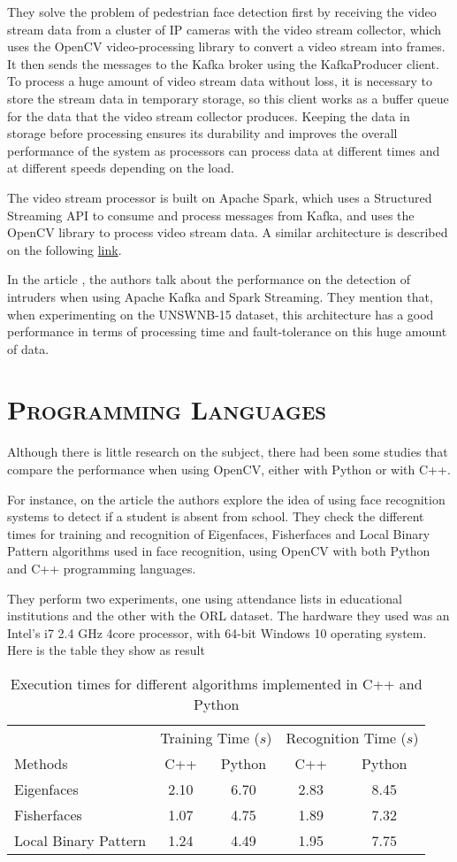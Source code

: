 \documentclass[10pt,letterpaper]{article}
\newcommand{\ssection}[1]{%
  \section*{\normalfont\scshape #1}}
\begin{document}
They solve the problem of pedestrian face detection first by receiving the video stream data from a cluster of IP cameras with the video stream collector, which uses the OpenCV video-processing library to convert a video stream into frames. It then sends the messages to the Kafka broker using the KafkaProducer client. To process a huge amount of video stream data without loss, it is necessary to store the stream data in temporary storage, so this client works as a buffer queue for the data that the video stream collector produces. Keeping the data in storage before processing ensures its durability and improves the overall performance of the system as processors can process data at different times and at different speeds depending on the load.
  
The video stream processor is built on Apache Spark, which uses a Structured Streaming API to consume and process messages from Kafka, and uses the OpenCV library to process video stream data. A similar architecture is described on the following \href{https://www.infoq.com/articles/video-stream-analytics-opencv/}{link}.

In the article \cite{Tun2019b}, the authors talk about the performance on the detection of intruders when using Apache Kafka and Spark Streaming. They mention that, when experimenting on the UNSWNB-15 dataset, this architecture has a good performance in terms of processing time and fault-tolerance on this huge amount of data.

\ssection{Programming Languages}

Although there is little research on the subject, there had been some studies that compare the performance when using OpenCV,	 either with Python or with C++. 

For instance, on the article \cite{Fatih2016} the authors explore the idea of using face recognition systems to detect if a student is absent from school. They check the different times for training and recognition of Eigenfaces, Fisherfaces and Local Binary Pattern algorithms used in face recognition, using OpenCV with both Python and C++ programming languages.

They perform two experiments, one using attendance lists in educational institutions and the other with the ORL dataset. The hardware they used was an Intel's i7 2.4 GHz 4core processor, with 64-bit Windows 10 operating system. Here is the table they show as result
\begin{table}
\centering
\begin{tabular}{@{}l|cccc@{}} \toprule
&\multicolumn{2}{c}{Training Time ($s$)}&\multicolumn{2}{c}{Recognition Time ($s$)} \\ \cmidrule(r){2-5}
Methods&C++&Python&C++&Python\\ \cmidrule(r){1-5}
Eigenfaces & 2.10 & 6.70 & 2.83 & 8.45\\
Fisherfaces  & 1.07  & 4.75 &1.89 & 7.32\\
Local Binary Pattern & 1.24 & 4.49 &1.95 &7.75\\ \bottomrule
\end{tabular}
\caption{Execution times for different algorithms implemented in C++ and Python}
\label{schooltable}
\end{table}
\end{document}
